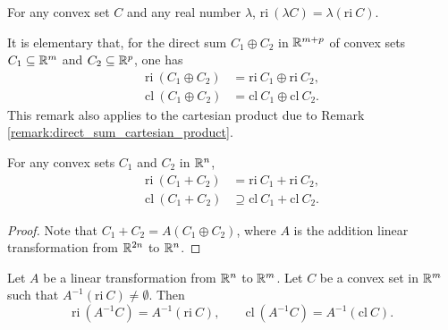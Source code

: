 \documentclass[11pt,a4paper]{article}
\begin{document}
\begin{corollary}\label{cor:ri_scalar_multiple}
    For any convex set $C$ and any real number $\lambda$, $\mathrm{ri}\ (\lambda C) = \lambda (\mathrm{ri}\ C)$.
\end{corollary}

\begin{remark}
    It is elementary that, for the direct sum $C_1\oplus C_2$ in $\mathbb{R}^{m+p}$ of convex sets $C_1\subseteq \mathbb{R}^m$ and $C_2\subseteq \mathbb{R}^p$, one has
    \begin{align*}
        \mathrm{ri}\ (C_1\oplus C_2) &= \mathrm{ri}\ C_1\oplus \mathrm{ri}\ C_2,\\
        \mathrm{cl}\ (C_1\oplus C_2) &= \mathrm{cl}\ C_1\oplus \mathrm{cl}\ C_2.
    \end{align*}
    This remark also applies to the cartesian product due to Remark \ref{remark:direct_sum_cartesian_product}.
\end{remark}

\begin{corollary}
    For any convex sets $C_1$ and $C_2$ in $\mathbb{R}^{n}$,
    \begin{align*}
        \mathrm{ri}\ (C_1+ C_2) &= \mathrm{ri}\ C_1+ \mathrm{ri}\ C_2,\\
        \mathrm{cl}\ (C_1+ C_2) &\supseteq \mathrm{cl}\ C_1+ \mathrm{cl}\ C_2.
    \end{align*}
\end{corollary}

\begin{proof}
    Note that $C_1+C_2 = A(C_1\oplus C_2)$, where $A$ is the addition linear transformation from $\mathbb{R}^{2n}$ to $\mathbb{R}^n$.
\end{proof}

\begin{theorem}\label{thm:ri_cl_inverse_linear_transformation}
    Let $A$ be a linear transformation from $\mathbb{R}^n$ to $\mathbb{R}^m$. Let $C$ be a convex set in $\mathbb{R}^m$ such that $A^{-1}(\mathrm{ri}\ C)\neq \emptyset$. Then 
    \begin{equation*}
        \mathrm{ri}\ (A^{-1}C) = A^{-1}(\mathrm{ri}\ C),\qquad \mathrm{cl}\ (A^{-1}C) = A^{-1}(\mathrm{cl}\ C).
    \end{equation*}
\end{theorem}
\end{document}
